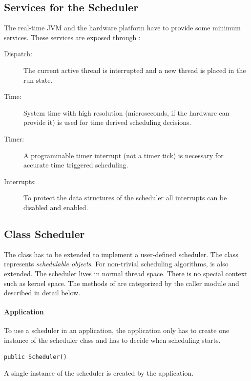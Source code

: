 \subsection{Services for the Scheduler}

The real-time JVM and the hardware platform have to provide some
minimum services. These services are exposed through
:

\begin{description}

\item[Dispatch:] The current active thread is interrupted and a new
thread is placed in the run state.

\item[Time:] System time with high resolution (microseconds, if the
hardware can provide it) is used for time derived scheduling
decisions.

\item[Timer:] A programmable timer interrupt (not a timer tick) is
necessary for accurate time triggered scheduling.

\item[Interrupts:] To protect the data structures of the scheduler all
interrupts can be disabled and enabled.

\end{description}

\subsection{Class Scheduler}

The class  has to be extended to implement a
user-defined scheduler. The class  represents
\emph{schedulable objects}. For non-trivial scheduling algorithms,
 is also extended. The scheduler lives in normal thread
space. There is no special context such as kernel space. The methods
of  are categorized by the caller module and
described in detail below.

\paragraph{Application}

To use a scheduler in an application, the application only has to
create one instance of the scheduler class and has to decide when
scheduling starts.

\begin{lstlisting}[emph=Scheduler]
public Scheduler()
\end{lstlisting}
A single instance of the scheduler is created by the application.


